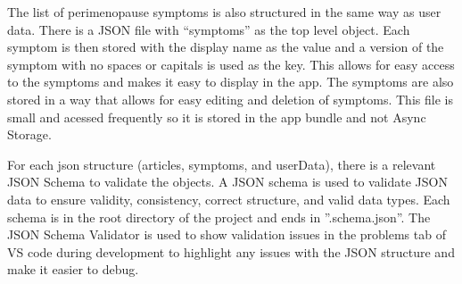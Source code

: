 The list of perimenopause symptoms is also structured in the same way as user data. There is a JSON file with ``symptoms'' as the top level object. Each symptom is then stored with the display name as the value and a version of the symptom with no spaces or capitals is used as the key. This allows for easy access to the symptoms and makes it easy to display in the app. The symptoms are also stored in a way that allows for easy editing and deletion of symptoms. This file is small and acessed frequently so it is stored in the app bundle and not Async Storage.

For each json structure (articles, symptoms, and userData), there is a relevant JSON Schema to validate the objects. A JSON schema is used to validate JSON data to ensure validity, consistency, correct structure, and valid data types\cite{JsonSchema2025}\cite{JsonSchemaOrg2025}. Each schema is in the root directory of the project and ends in ''.schema.json''. The JSON Schema Validator is used to show validation issues in the problems tab of VS code during development to highlight any issues with the JSON structure and make it easier to debug.
